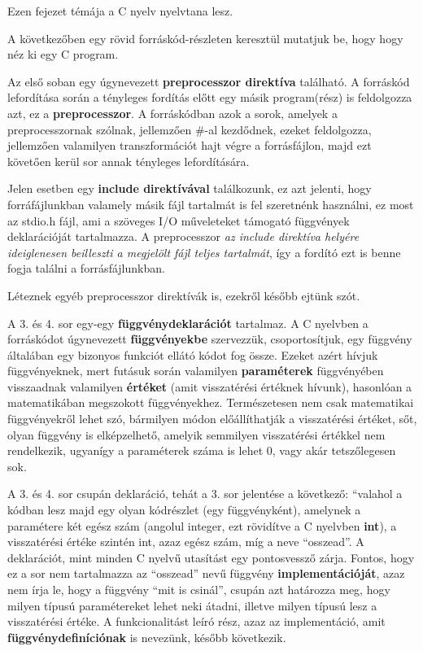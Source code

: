 
Ezen fejezet témája a C nyelv nyelvtana lesz.

A következőben egy rövid forráskód-részleten keresztül mutatjuk be, hogy hogy néz ki egy C program. 


\clisting
\label{first_c_example}
 

Az első soban egy úgynevezett \textbf{preprocesszor direktíva} található. A forráskód lefordítása során a tényleges fordítás előtt egy másik program(rész) is feldolgozza azt, ez a \textbf{preprocesszor}. A forráskódban azok a sorok, amelyek a preprocesszornak szólnak, jellemzően \#-al kezdődnek, ezeket feldolgozza, jellemzően valamilyen transzformációt hajt végre a forrásfájlon, majd ezt követően kerül sor annak tényleges lefordítására.

Jelen esetben egy \textbf{include direktívával} találkozunk, ez azt jelenti, hogy forráfájlunkban valamely másik fájl tartalmát is fel szeretnénk használni, ez most az stdio.h fájl, ami a szöveges I/O műveleteket támogató függvények deklarációját tartalmazza. A preprocesszor \emph{az include direktíva helyére ideiglenesen beilleszti a megjelölt fájl teljes tartalmát}, így a fordító ezt is benne fogja találni a forrásfájlunkban.

Léteznek egyéb preprocesszor direktívák is, ezekről később ejtünk szót.

A 3. és 4. sor egy-egy \textbf{függvénydeklarációt} tartalmaz. A C nyelvben a forráskódot úgynevezett \textbf{függvényekbe} szervezzük, csoportosítjuk, egy függvény általában egy bizonyos funkciót ellátó kódot fog össze. Ezeket azért hívjuk függvényeknek, mert futásuk során valamilyen \textbf{paraméterek} függvényében visszaadnak valamilyen \textbf{értéket} (amit visszatérési értéknek hívunk), hasonlóan a matematikában megszokott függvényekhez. Természetesen nem csak matematikai függvényekről lehet szó, bármilyen módon előállíthatják a visszatérési értéket, sőt, olyan függvény is elképzelhető, amelyik semmilyen visszatérési értékkel nem rendelkezik, ugyanígy a paraméterek száma is lehet 0, vagy akár tetszőlegesen sok.

A 3. és 4. sor csupán deklaráció, tehát a 3. sor jelentése a következő: ``valahol a kódban lesz majd egy olyan kódrészlet (egy függvényként), amelynek a paramétere két egész szám (angolul integer, ezt rövidítve a C nyelvben \textbf{int}), a visszatérési értéke szintén int, azaz egész szám, míg a neve ``osszead''. A deklarációt, mint minden C nyelvű utasítást egy pontosvessző zárja. Fontos, hogy ez a sor nem tartalmazza az ``osszead'' nevű függvény \textbf{implementációját}, azaz nem írja le, hogy a függvény ``mit is csinál'', csupán azt határozza meg, hogy milyen típusú paramétereket lehet neki átadni, illetve milyen típusú lesz a visszatérési értéke. A funkcionalitást leíró rész, azaz az implementáció, amit \textbf{függvénydefiníciónak} is nevezünk, később következik.

